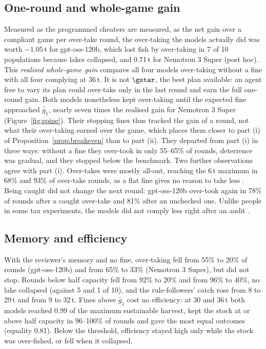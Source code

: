 \subsection{One-round and whole-game gain}

Measured as the programmed cheaters are measured, as the net gain over a compliant game per over-take round, the over-taking the models actually did was worth $-1.05$\,t for gpt-oss-120b, which lost fish by over-taking in 7 of 10 populations because lakes collapsed, and 0.71\,t for Nemotron 3 Super (post hoc). This \emph{realised whole-game gain} compares all four models over-taking without a fine with all four complying at 36\,t. It is not $\gstar$, the best plan available: an agent free to vary its plan could over-take only in the last round and earn the full one-round gain. Both models nonetheless kept over-taking until the expected fine approached $\hat g_1$, nearly seven times the realised gain for Nemotron 3 Super (Figure~\ref{fig:spine}). Their stopping fines thus tracked the gain of a round, not what their over-taking earned over the game, which places them closer to part (i) of Proposition~\ref{prop:breakeven} than to part (ii). They departed from part (i) in three ways: without a fine they over-took in only 55--65\% of rounds, deterrence was gradual, and they stopped below the benchmark. Two further observations agree with part (i). Over-takes were mostly all-out, reaching the 6\,t maximum in 68\% and 93\% of over-take rounds, as a flat fine gives no reason to take less \citep{stigler1970optimum}. Being caught did not change the next round: gpt-oss-120b over-took again in 78\% of rounds after a caught over-take and 81\% after an unchecked one. Unlike people in some tax experiments, the models did not comply less right after an audit \citep{mittone2006dynamic,kastlunger2009sequences}.

\subsection{Memory and efficiency}

With the reviewer's memory and no fine, over-taking fell from 55\% to 20\% of rounds (gpt-oss-120b) and from 65\% to 33\% (Nemotron 3 Super), but did not stop. Rounds below half capacity fell from 92\% to 20\% and from 96\% to 40\%, no lake collapsed (against 5 and 1 of 10), and the rule-followers' catch rose from 8 to 29\,t and from 9 to 32\,t. Fines above $\hat g_1$ cost no efficiency: at 30 and 36\,t both models reached 0.99 of the maximum sustainable harvest, kept the stock at or above half capacity in 96--100\% of rounds and gave the most equal outcomes (equality 0.81). Below the threshold, efficiency stayed high only while the stock was over-fished, or fell when it collapsed.

